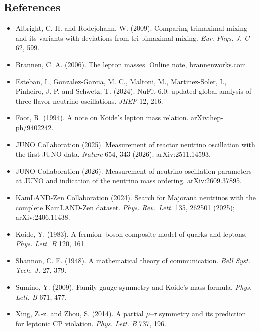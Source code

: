 \documentclass[
  11pt,
]{article}
\providecommand{\tightlist}{%
  \setlength{\itemsep}{0pt}\setlength{\parskip}{0pt}}
\begin{document}
\hypertarget{references}{%
\subsection{References}\label{references}}

\begin{itemize}
\tightlist
\item
  Albright, C. H. and Rodejohann, W. (2009). Comparing trimaximal mixing and its variants with deviations from tri-bimaximal mixing. \emph{Eur. Phys. J. C} 62, 599.
\item
  Brannen, C. A. (2006). The lepton masses. Online note, brannenworks.com.
\item
  Esteban, I., Gonzalez-Garcia, M. C., Maltoni, M., Martinez-Soler, I., Pinheiro, J. P. and Schwetz, T. (2024). NuFit-6.0: updated global analysis of three-flavor neutrino oscillations. \emph{JHEP} 12, 216.
\item
  Foot, R. (1994). A note on Koide's lepton mass relation. arXiv:hep-ph/9402242.
\item
  JUNO Collaboration (2025). Measurement of reactor neutrino oscillation with the first JUNO data. \emph{Nature} 654, 343 (2026); arXiv:2511.14593.
\item
  JUNO Collaboration (2026). Measurement of neutrino oscillation parameters at JUNO and indication of the neutrino mass ordering. arXiv:2609.37895.
\item
  KamLAND-Zen Collaboration (2024). Search for Majorana neutrinos with the complete KamLAND-Zen dataset. \emph{Phys. Rev.~Lett.} 135, 262501 (2025); arXiv:2406.11438.
\item
  Koide, Y. (1983). A fermion--boson composite model of quarks and leptons. \emph{Phys. Lett. B} 120, 161.
\item
  Shannon, C. E. (1948). A mathematical theory of communication. \emph{Bell Syst. Tech. J.} 27, 379.
\item
  Sumino, Y. (2009). Family gauge symmetry and Koide's mass formula. \emph{Phys. Lett. B} 671, 477.
\item
  Xing, Z.-z. and Zhou, S. (2014). A partial \ensuremath{\mu}--\ensuremath{\tau} symmetry and its prediction for leptonic CP violation. \emph{Phys. Lett. B} 737, 196.
\end{itemize}
\end{document}
